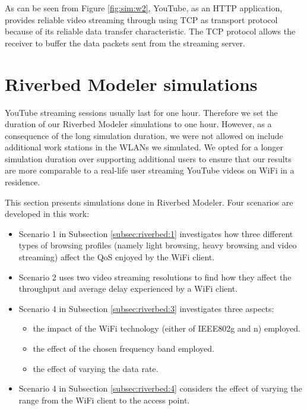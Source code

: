 As can be seen from Figure \ref{fig:sim:w2}, YouTube, as an \gls{HTTP} application, provides reliable video streaming through using \gls{TCP} as transport protocol because of its reliable data transfer  characteristic. The \gls{TCP} protocol allows the receiver to buffer the data packets sent from the streaming server.

\section{Riverbed Modeler simulations} \label{sec:simul:riverbed}
%
%

YouTube streaming sessions usually last for one hour. Therefore we set the duration of our Riverbed Modeler simulations to one hour. However, as a consequence of the long simulation duration, we were not allowed on include additional work stations in the \gls{WLAN}s we simulated. We opted for a longer simulation duration over supporting additional users to ensure that our results are more comparable to a real-life user streaming YouTube videos on \gls{WiFi} in a residence.

This section presents simulations done in Riverbed Modeler. Four scenarios are developed in this work:
\begin{itemize}
	\item Scenario 1 in Subsection \ref{subsec:riverbed:1} investigates how three different types of browsing profiles (namely light browsing, heavy browsing and video streaming) affect the \gls{QoS} enjoyed by the \gls{WiFi} client.
	\item Scenario 2 uses two video streaming resolutions to find how they affect the throughput and average delay experienced by a \gls{WiFi} client.	
	\item Scenario 4 in Subsection \ref{subsec:riverbed:3} investigates three aspects: \begin{itemize}
		\item the impact of the \gls{WiFi} technology (either of \gls{IEEE802}g and n) employed.
		\item the effect of the chosen frequency band employed.
		\item the effect of varying the data rate.
	\end{itemize}
\item Scenario 4 in Subsection \ref{subsec:riverbed:4} considers the effect of varying the range from the \gls{WiFi} client to the access point.
\end{itemize}

